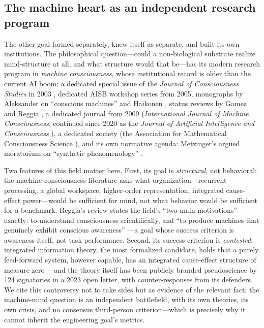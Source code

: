 \documentclass[10pt]{article}
\begin{document}
\subsection{The machine heart as an independent research program}\label{sec:genealogymc}

The other goal formed separately, knew itself as separate, and built its own institutions. The philosophical question---could a non-biological substrate realize mind-structure at all, and what structure would that be---has its modern research program in \emph{machine consciousness}, whose institutional record is older than the current AI boom: a dedicated special issue of the \emph{Journal of Consciousness Studies} in 2003 \cite{holland2003machine}, dedicated AISB workshop series from 2005, monographs by Aleksander on ``conscious machines'' \cite{aleksander1996impossible} and Haikonen \cite{haikonen2003cognitive}, status reviews by Gamez \cite{gamez2008progress} and Reggia \cite{reggia2013rise}, a dedicated journal from 2009 (\emph{International Journal of Machine Consciousness}, continued since 2020 as the \emph{Journal of Artificial Intelligence and Consciousness} \cite{jaic2020}), a dedicated society (the Association for Mathematical Consciousness Science \cite{amcs2023letter}), and its own normative agenda: Metzinger's argued moratorium on ``synthetic phenomenology'' \cite{metzinger2021artificial}.

Two features of this field matter here. First, its goal is \emph{structural}, not behavioral: the machine-consciousness literature asks what organization---recurrent processing, a global workspace, higher-order representation, integrated cause-effect power---would be sufficient for mind, not what behavior would be sufficient for a benchmark. Reggia's review states the field's ``two main motivations'' exactly: to understand consciousness scientifically, and ``to produce machines that genuinely exhibit conscious awareness'' \cite{reggia2013rise}---a goal whose success criterion is awareness itself, not task performance. Second, its success criterion is \emph{contested}: integrated information theory, the most formalized candidate, holds that a purely feed-forward system, however capable, has an integrated cause-effect structure of measure zero \cite{albantakis2023iit}---and the theory itself has been publicly branded pseudoscience by 124 signatories in a 2023 open letter, with counter-responses from its defenders. We cite this controversy not to take sides but as evidence of the relevant fact: the machine-mind question is an independent battlefield, with its own theories, its own crisis, and no consensus third-person criterion---which is precisely why it cannot inherit the engineering goal's metrics.
\end{document}
